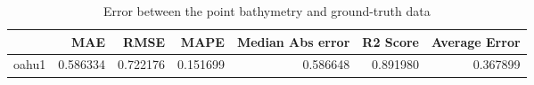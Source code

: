 \begin{table}[h!]
\caption{Error between the point bathymetry and ground-truth data}
\label{tab:oahu1_lidar_error}
\begin{tabular}{lrrrrrr}
\toprule
 & MAE & RMSE & MAPE & Median Abs error & R2 Score & Average Error \\
\midrule
oahu1 & 0.586334 & 0.722176 & 0.151699 & 0.586648 & 0.891980 & 0.367899 \\
\bottomrule
\end{tabular}
\end{table}
